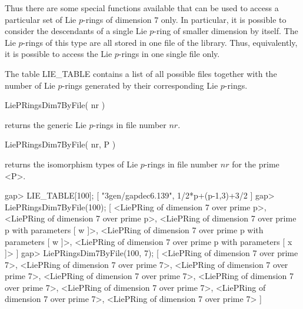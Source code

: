 Thus there are some special functions available that can be used to access
a particular set of Lie $p$-rings of dimension $7$ only. In particular, it
is possible to consider the descendants of a single Lie $p$-ring of smaller
dimension by itself. The Lie $p$-rings of this type are all stored in one
file of the library. Thus, equivalently, it is possible to access the Lie
$p$-rings in one single file only.

The table LIE_TABLE contains a list of all possible files together with
the number of Lie $p$-rings generated by their corresponding Lie $p$-rings. 

\> LiePRingsDim7ByFile( nr )

returns the generic Lie $p$-rings in file number $nr$.

\> LiePRingsDim7ByFile( nr, P )

returns the isomorphism types of Lie $p$-rings in file number $nr$ for
the prime <P>.

\beginexample
gap> LIE_TABLE[100];
[ "3gen/gapdec6.139", 1/2*p+(p-1,3)+3/2 ]
gap> LiePRingsDim7ByFile(100);
[ <LiePRing of dimension 7 over prime p>, 
  <LiePRing of dimension 7 over prime p>, 
  <LiePRing of dimension 7 over prime p with parameters [ w ]>, 
  <LiePRing of dimension 7 over prime p with parameters [ w ]>, 
  <LiePRing of dimension 7 over prime p with parameters [ x ]> ]
gap> LiePRingsDim7ByFile(100, 7);
[ <LiePRing of dimension 7 over prime 7>, 
  <LiePRing of dimension 7 over prime 7>, 
  <LiePRing of dimension 7 over prime 7>, 
  <LiePRing of dimension 7 over prime 7>, 
  <LiePRing of dimension 7 over prime 7>, 
  <LiePRing of dimension 7 over prime 7>, 
  <LiePRing of dimension 7 over prime 7>, 
  <LiePRing of dimension 7 over prime 7> ]
\endexample

